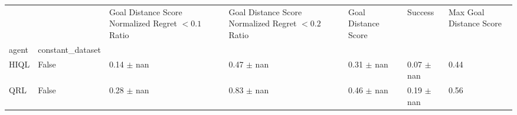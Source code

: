 \begin{tabular}{lllllll}
\toprule
 &  & Goal Distance Score Normalized Regret $< 0.1$ Ratio & Goal Distance Score Normalized Regret $< 0.2$ Ratio & Goal Distance Score & Success & Max Goal Distance Score \\
agent & constant_dataset &  &  &  &  &  \\
\midrule
HIQL & False & 0.14 $\pm$ nan & 0.47 $\pm$ nan & 0.31 $\pm$ nan & 0.07 $\pm$ nan & 0.44 \\
\cline{1-7}
QRL & False & 0.28 $\pm$ nan & 0.83 $\pm$ nan & 0.46 $\pm$ nan & 0.19 $\pm$ nan & 0.56 \\
\cline{1-7}
\bottomrule
\end{tabular}
